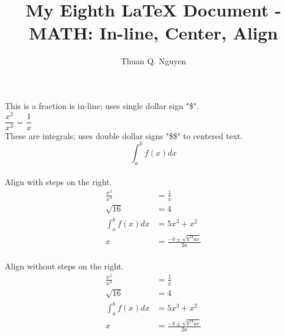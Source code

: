 \documentclass{article}
\begin{document}
\title{My Eighth \LaTeX{} Document - MATH: In-line, Center, Align}
\author{Thuan Q. Nguyen}
\maketitle


This is a fraction is in-line; uses single dollar sign "\$". \\
$\dfrac{x^2}{x^3}$ = $\dfrac{1}{x}$ \\

These are integrals; uses double dollar signs "\$\$" to centered text. $$\int_{a}^{b}f(x)dx$$ \\

Align with steps on the right. \\
\begin{align}
    \frac{x^2}{x^3} &= \frac{1}{x} \\
    \sqrt{16} &=4 \\
    \int_{a}^{b}f(x)dx &= 5x^3 + x^2 \\
    x &=\frac{-b \pm \sqrt{b^24ac}}{2a} \\
\end{align}

Align without steps on the right. \\
\begin{align*}
    \frac{x^2}{x^3} &= \frac{1}{x} \\
    \sqrt{16} &=4 \\
    \int_{a}^{b}f(x)dx &= 5x^3 + x^2 \\
    x &=\frac{-b \pm \sqrt{b^24ac}}{2a}
\end{align*}
\end{document}
